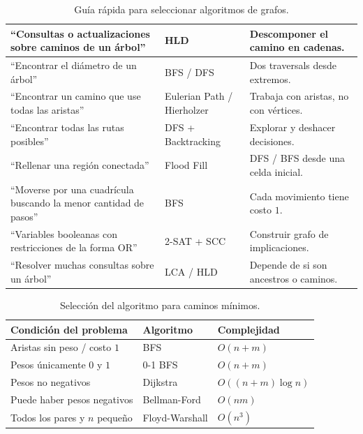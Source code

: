 \documentclass[10pt,a4paper,twocolumn]{article}
\begin{document}
\begin{table}[H]
\begin{tabular}{|p{}|p{}|p{}|}
``Consultas o actualizaciones sobre caminos de un árbol'' &
HLD &
Descomponer el camino en cadenas. \\
\hline

``Encontrar el diámetro de un árbol'' &
BFS / DFS &
Dos traversals desde extremos. \\
\hline

``Encontrar un camino que use todas las aristas'' &
Eulerian Path / Hierholzer &
Trabaja con aristas, no con vértices. \\
\hline

``Encontrar todas las rutas posibles'' &
DFS + Backtracking &
Explorar y deshacer decisiones. \\
\hline

``Rellenar una región conectada'' &
Flood Fill &
DFS / BFS desde una celda inicial. \\
\hline

``Moverse por una cuadrícula buscando la menor cantidad de pasos'' &
BFS &
Cada movimiento tiene costo $1$. \\
\hline

``Variables booleanas con restricciones de la forma OR'' &
2-SAT + SCC &
Construir grafo de implicaciones. \\
\hline

``Resolver muchas consultas sobre un árbol'' &
LCA / HLD &
Depende de si son ancestros o caminos. \\
\hline

\end{tabular}
\caption{Guía rápida para seleccionar algoritmos de grafos.}
\end{table}
\begin{table}[H]
\raggedright
\scriptsize
\setlength{\tabcolsep}{3pt}
\renewcommand{\arraystretch}{1.15}
\begin{tabular}{|p{}|p{}|p{}|}
\hline
\textbf{Condición del problema} &
\textbf{Algoritmo} &
\textbf{Complejidad} \\
\hline
Aristas sin peso / costo $1$ &
BFS &
$O(n+m)$ \\
\hline
Pesos únicamente $0$ y $1$ &
0-1 BFS &
$O(n+m)$ \\
\hline
Pesos no negativos &
Dijkstra &
$O((n+m)\log n)$ \\
\hline
Puede haber pesos negativos &
Bellman-Ford &
$O(nm)$ \\
\hline
Todos los pares y $n$ pequeño &
Floyd-Warshall &
$O(n^3)$ \\
\hline
\end{tabular}
\caption{Selección del algoritmo para caminos mínimos.}
\end{table}
\end{document}
